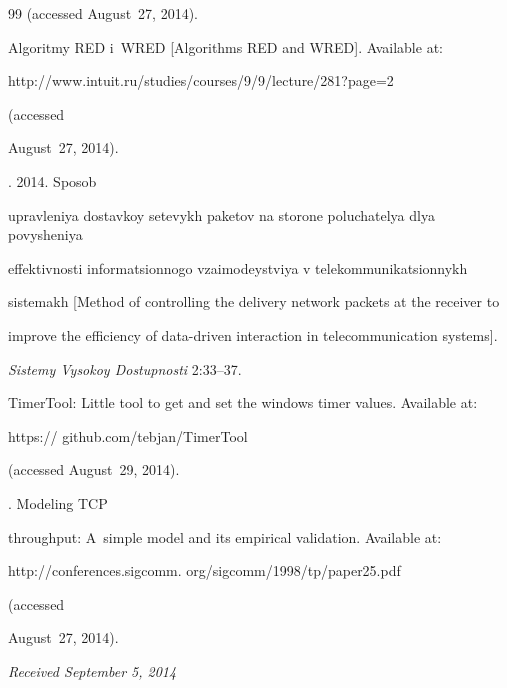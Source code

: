 {{\begin{thebibliography}{99}
(accessed August~27, 2014).




Algoritmy RED i~WRED [Algorithms RED and WRED]. Available at: {\sf


http://www.intuit.ru/studies/courses/9/9/lecture/281?page=2} (accessed


August~27, 2014).




. 2014. Sposob


upravleniya dostavkoy setevykh paketov na storone poluchatelya dlya povysheniya


effektivnosti informatsionnogo vzaimodeystviya v telekommunikatsionnykh


sistemakh [Method of controlling the delivery network packets at the receiver to


improve the efficiency of data-driven interaction in telecommunication systems].


\textit{Sistemy Vysokoy Dostupnosti} 2:33--37.




TimerTool: Little tool to get and set the windows timer values. Available at: {\sf


https:// github.com/tebjan/TimerTool} (accessed August~29, 2014).




. Modeling TCP


throughput: A~simple model and its empirical validation. Available at: {\sf


http://conferences.sigcomm. org/sigcomm/1998/tp/paper25.pdf} (accessed


August~27, 2014).


\end{thebibliography}


} }








\vspace*{-6pt}





\hfill{\small\textit{Received September 5, 2014}}





\Contr





